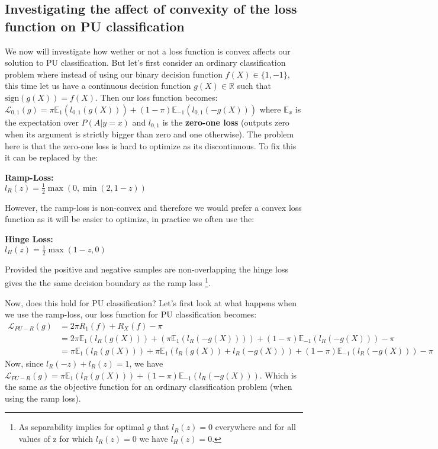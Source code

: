 \subsection{Investigating the affect of convexity of the loss function on PU classification}
We now will investigate how wether or not a loss function is convex affects our solution to PU classification. But let's first consider an ordinary classification problem where instead of using our binary decision function $f(X) \in \{1,-1\}$, this time let us have a continuous decision function $g(X) \in \mathbb{R}$ such that $\text{sign}(g(X)) = f(X)$. Then our loss function becomes: $\mathcal{L}_{0,1}(g) = \pi \mathbb{E}_{1} (l_{0,1} (g(X))) + (1- \pi) \mathbb{E}_{-1} (l_{0,1}(-g(X)))$ where $\mathbb{E}_{x}$ is the expectation over $P(A| y=x)$ and $l_{0,1}$ is the \textbf{zero-one loss} (outputs zero when its argument is strictly bigger than zero and one otherwise). The problem here is that the zero-one loss is hard to optimize as its discontinuous. To fix this it can be replaced by the:
\begin{definition}
    \textbf{Ramp-Loss:} \\
    $l_{R}(z) = \frac{1}{2} \max(0, \min(2,1-z))$
\end{definition}
However, the ramp-loss is non-convex and therefore we would prefer a convex loss function as it will be easier to optimize, in practice we often use the:
\begin{definition}
    \textbf{Hinge Loss:} \\
    $l_{H}(z) = \frac{1}{2} \max(1-z,0)$
\end{definition}
Provided the positive and negative samples are non-overlapping the hinge loss gives the the same decision boundary as the ramp loss \footnote{As separability implies for optimal $g$ that $l_{R}(z)=0$ everywhere and for all values of z for which $l_{R}(z)=0$ we have $l_{H}(z)=0$.}. 

Now, does this hold for PU classification? Let's first look at what happens when we use the ramp-loss, our loss function for PU classification becomes:
\begin{align}
    \mathcal{L}_{PU-R}(g) &{} = 2 \pi R_{1}(f) + R_{X}(f) - \pi \\
    &= 2 \pi \mathbb{E}_{1} (l_{R}(g(X))) + (\pi \mathbb{E}_{1} (l_{R}(-g(X)))) + (1 - \pi) \mathbb{E}_{-1} (l_{R}(-g(X))) - \pi \\
    &= \pi \mathbb{E}_{1}(l_{R}(g(X))) + \pi \mathbb{E}_{1} (l_{R}(g(X)) + l_{R}(-g(X))) + (1-\pi) \mathbb{E}_{-1}(l_{R}(-g(X))) - \pi
\end{align} 
Now, since $l_{R}(-z)+l_{R}(z)=1$, we have $\mathcal{L}_{PU-R}(g) = \pi \mathbb{E}_{1} (l_{R}(g(X))) + (1-\pi) \mathbb{E}_{-1}(l_{R}(-g(X)))$. Which is the same as the objective function for an ordinary classification problem (when using the ramp loss). 

